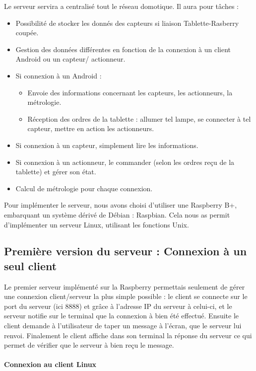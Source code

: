 \documentclass[a4paper,10pt]{article}
\begin{document}
Le serveur servira a centralisé tout le réseau domotique. Il aura pour tâches : \\
\begin{itemize}
	\item Possibilité de stocker les donnés des capteurs si liaison Tablette-Rasberry coupée.
	\item Gestion des données différentes en fonction de la connexion à un client Android ou un capteur/	actionneur. 
	\item Si connexion à un Android : 
		\begin{itemize}
			\item Envoie des informations concernant les capteurs, les actionneurs, la métrologie.
			\item Réception des ordres de la tablette : allumer tel lampe, se connecter à tel capteur, mettre en action les actionneurs.
		\end{itemize}
	\item Si connexion à un capteur, simplement lire les informations.
	\item Si connexion à un actionneur, le commander (selon les ordres reçu de la tablette) et gérer son état.
	\item Calcul de métrologie pour chaque connexion.
\end{itemize}

Pour implémenter le serveur, nous avons choisi d'utiliser une Raspberry B+, embarquant un système dérivé de Débian : Raspbian. Cela nous as permit d'implémenter un serveur Linux, utilisant les fonctions Unix.

\subsection{Première version du serveur : Connexion à un seul client}

Le premier serveur implémenté sur la Raspberry permettais seulement de gérer une connexion client/serveur la plus simple possible : le client se connecte sur le port du serveur (ici 8888) et grâce à l'adresse IP du serveur à celui-ci, et le serveur notifie sur le terminal que la connexion à bien été effectué. Ensuite le client demande à l'utilisateur de taper un message à l'écran, que le serveur lui renvoi. Finalement le client affiche dans son terminal la réponse du serveur ce qui permet de vérifier que le serveur à bien reçu le message.

\paragraph{Connexion au client Linux}
\end{document}
